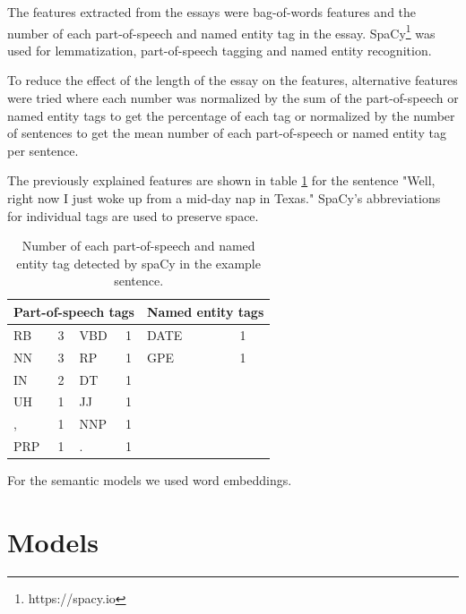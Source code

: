 \documentclass[10pt, a4paper]{article}
\begin{document}
The features extracted from the essays were bag-of-words features and the number of each part-of-speech and named entity tag in the essay.
SpaCy\footnote{https://spacy.io} was used for lemmatization, part-of-speech tagging and named entity recognition.

To reduce the effect of the length of the essay on the features, alternative features were tried where each number was normalized by the sum of the part-of-speech or named entity tags to get the percentage of each tag or normalized by the number of sentences to get the mean number of each part-of-speech or named entity tag per sentence.

The previously explained features are shown in table \ref{example features} for the sentence "Well, right now I just woke up from a mid-day nap in Texas."
SpaCy's abbreviations for individual tags are used to preserve space.

\begin{table}[H]
	\centering
	\begin{tabular}{llllll}
		\hline
		\multicolumn{4}{l}{Part-of-speech tags} & \multicolumn{2}{l}{Named entity tags} \\ \hline
		RB        & 3       & VBD      & 1      & DATE                & 1               \\
		NN        & 3       & RP       & 1      & GPE                 & 1               \\ \cline{5-6} 
		IN        & 2       & DT       & 1      &                     &                 \\
		UH        & 1       & JJ       & 1      &                     &                 \\
		,         & 1       & NNP      & 1      &                     &                 \\
		PRP       & 1       & .        & 1      &                     &                 \\ \cline{1-4}
	\end{tabular}
	\caption{Number of each part-of-speech and named entity tag detected by spaCy in the example sentence.}
	\label{example features}
\end{table}

For the semantic models we used word embeddings.

\section{Models}
\end{document}
